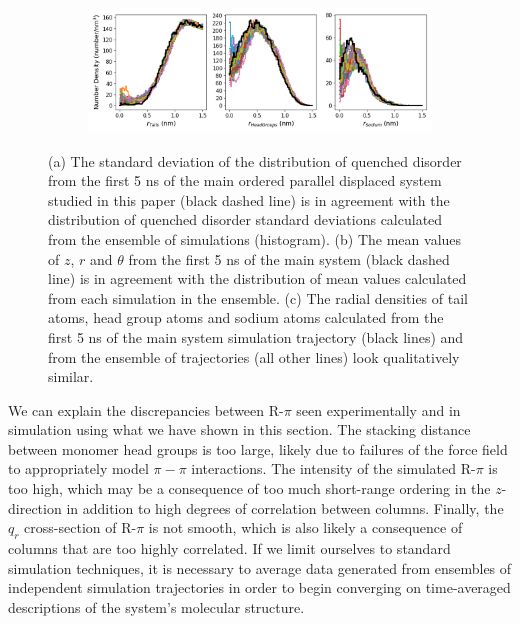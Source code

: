 \documentclass[journal=jpcbfk,manuscript=article]{achemso}
\begin{document}
\begin{figure}[!htb]
  \begin{subfigure}{\textwidth}
  \includegraphics[width=\textwidth]{offset_ensemble_regional_density.png}
  \caption{}\label{fig:offset_ensemble_regional_density}
  \end{subfigure}
  \caption{(a) The standard deviation of the distribution of quenched disorder
  from the first 5 ns of the main ordered parallel displaced system studied in
  this paper (black dashed line) is in agreement with the distribution of quenched disorder 
  standard deviations calculated from the ensemble of simulations (histogram). 
  (b) The mean values of $z$, $r$ and $\theta$ from the first 5 ns of the main
  system (black dashed line) is in agreement with the distribution of mean values
  calculated from each simulation in the ensemble. (c) The radial densities of tail
  atoms, head group atoms and sodium atoms calculated from the first 5 ns of the
  main system simulation trajectory (black lines) and from the ensemble of 
  trajectories (all other lines) look qualitatively similar.}\label{fig:ensemble_stds}
  \end{figure}
  
  We can explain the discrepancies between R-$\pi$ seen experimentally
  and in simulation using what we have shown in this section. The stacking
  distance between monomer head groups is too large, likely due to failures
  of the force field to appropriately model $\pi-\pi$ interactions. The intensity
  of the simulated R-$\pi$ is too high, which may be a consequence of too much short-range
  ordering in the $z$-direction in addition to high degrees of correlation 
  between columns. Finally, the $q_r$ cross-section of R-$\pi$ is not smooth, 
  which is also likely a consequence of columns that are too highly correlated.
  If we limit ourselves to standard simulation techniques, it is necessary to 
  average data generated from ensembles of independent simulation trajectories
  in order to begin converging on time-averaged descriptions of the system's
  molecular structure. 
  
\end{document}
